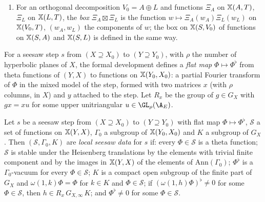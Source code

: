 \begin{definition}
\begin{enumerate}[label=(\alph*)]
\emph{Fourier--Jacobi-to-Bessel step} is a seesaw step from the spaces of $\mathcal B$ to those of $\mathcal J$. In both cases the flat map
$\Phi\mapsto\Phi^\flat$ of the step (\cref{pf:fs:loc}) is formed with the matrices prescribed by the type of the step (built from the
isotropic families and the Bessel vector of $\zeta$).
\item For an orthogonal decomposition $V_0=A\oplus L$ and functions $\Xi_A$ on $\mathbb X(A,T)$, $\Xi_L$ on $\mathbb X(L,T)$, the \emph{box}
$\Xi_A\boxtimes\Xi_L$ is the function $w\mapsto\Xi_A(w_A)\Xi_L(w_L)$ on $\mathbb X(V_0,T)$, $(w_A,w_L)$ the components of $w$; the box
on $\mathbb X(S,V_0)$ of functions on $\mathbb X(S,A)$ and $\mathbb X(S,L)$ is defined in the same way.
\end{enumerate}
\end{definition}

For a seesaw step $s$ from $(X\supseteq X_0)$ to $(Y\supseteq Y_0)$, with $\rho$ the number of hyperbolic planes of $X$, the formal development
defines a \emph{flat map} $\Phi\mapsto\Phi^\flat$ from theta functions of $(Y,X)$ to functions on $\mathbb X(Y_0,X_0)$: a partial Fourier transform
of $\Phi$ in the mixed model of the step, formed with two matrices $x$ (with $\rho$ columns, in $X$) and $y$ attached to the step. Let $R_x$ be
the group of $g\in G_X$ with $gx=xu$ for some upper unitriangular $u\in\GL_\rho(\A_E)$.

\begin{definition}\label{pf:fs:loc}
Let $s$ be a seesaw step from $(X\supseteq X_0)$ to $(Y\supseteq Y_0)$ with flat map $\Phi\mapsto\Phi^\flat$, $\mathcal S$ a set of functions on
$\mathbb X(Y,X)$, $\Gamma_0$ a subgroup of $\mathbb X(Y_0,X_0)$ and $K$ a subgroup of $G_X$. Then $(\mathcal S,\Gamma_0,K)$ are \emph{local seesaw data}
for $s$ if: every $\Phi\in\mathcal S$ is a theta function; $\mathcal S$ is stable under the Heisenberg translations by the elements with trivial
finite component and by the images in $\mathbb X(Y,X)$ of the elements of $\mathrm{Ann}(\Gamma_0)$; $\Phi^\flat$ is a $\Gamma_0$-vacuum for every
$\Phi\in\mathcal S$; $K$ is a compact open subgroup of the finite part of $G_X$ and $\omega(1,k)\Phi=\Phi$ for $k\in K$ and $\Phi\in\mathcal S$; if
$(\omega(1,h)\Phi)^\flat\ne0$ for some $\Phi\in\mathcal S$, then $h\in R_x\,G_{X,\infty}\,K$; and $\Phi^\flat\ne0$ for some $\Phi\in\mathcal S$.
\end{definition}

